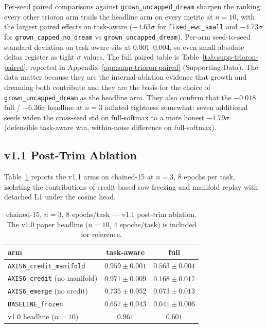 \documentclass[11pt]{article}
\newcommand{\arm}[1]{\texttt{#1}}
\begin{document}
Per-seed paired comparisons against \arm{grown\_uncapped\_dream}
sharpen the ranking: every other trioron arm trails the headline arm
on every metric at $n = 10$, with the largest paired effects on
task-aware ($-4.63\sigma$ for \arm{fixed\_ewc\_small} and $-4.73\sigma$
for \arm{grown\_capped\_no\_dream} vs \arm{grown\_uncapped\_dream}).
Per-arm seed-to-seed standard deviation on task-aware sits at
$0.001$--$0.004$, so even small absolute deltas register as tight
$\sigma$ values. The full paired table is
Table~\ref{tab:supp-trioron-paired}, reported in
Appendix~\ref{app:supp-trioron-paired} (Supporting Data). The data
matter because they are the internal-ablation evidence that growth and
dreaming both contribute and they are the basis for the choice of
\arm{grown\_uncapped\_dream} as the headline arm. They also confirm
that the $-0.018$ full / $-6.36\sigma$ headline at $n = 3$ inflated
tightness somewhat: seven additional seeds widen the cross-seed std on
full-softmax to a more honest $-1.79\sigma$ (defensible task-aware
win, within-noise difference on full-softmax).

\subsection{v1.1 Post-Trim Ablation}
\label{sec:results-v11}

Table~\ref{tab:v11-posttrim} reports the v1.1 arms on chained-15
at $n = 3$, 8 epochs per task, isolating the contributions of
credit-based row freezing and manifold replay with detached L1
under the cosine head.

\begin{table}[h]
  \centering
  \caption{chained-15, $n = 3$, 8 epochs/task --- v1.1 post-trim
           ablation. The v1.0 paper headline ($n = 10$, 4 epochs/task)
           is included for reference.}
  \label{tab:v11-posttrim}
  \begin{tabular}{lcc}
    \toprule
    arm                              & task-aware            & full              \\
    \midrule
    \arm{AXIS6\_credit\_manifold}    & $0.959 \pm 0.001$     & $0.563 \pm 0.004$ \\
    \arm{AXIS6\_credit} (no manifold)& $0.971 \pm 0.009$     & $0.168 \pm 0.017$ \\
    \arm{AXIS6\_emerge} (no credit)  & $0.735 \pm 0.052$     & $0.073 \pm 0.013$ \\
    \arm{BASELINE\_frozen}           & $0.657 \pm 0.043$     & $0.041 \pm 0.006$ \\
    \midrule
    v1.0 headline ($n = 10$)         & $0.961$               & $0.601$           \\
    \bottomrule
  \end{tabular}
\end{table}
\end{document}
